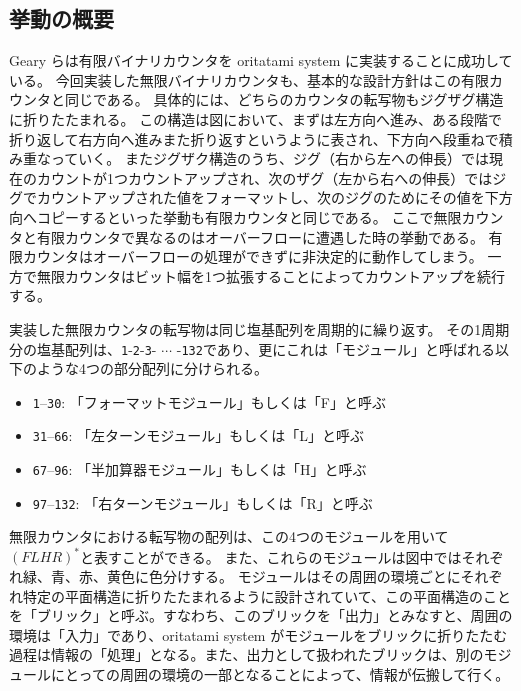 \documentclass[a4,11pt]{article}
\begin{document}

\subsection{挙動の概要}
Geary らは有限バイナリカウンタを oritatami system に実装することに成功している\cite{GeMeScSe2019}。
今回実装した無限バイナリカウンタも、基本的な設計方針はこの有限カウンタと同じである。
具体的には、どちらのカウンタの転写物もジグザグ構造に折りたたまれる。
この構造は図において、まずは左方向へ進み、ある段階で折り返して右方向へ進みまた折り返すというように表され、下方向へ段重ねで積み重なっていく。
またジグザク構造のうち、ジグ（右から左への伸長）では現在のカウントが1つカウントアップされ、次のザグ（左から右への伸長）ではジグでカウントアップされた値をフォーマットし、次のジグのためにその値を下方向へコピーするといった挙動も有限カウンタと同じである。
ここで無限カウンタと有限カウンタで異なるのはオーバーフローに遭遇した時の挙動である。
有限カウンタはオーバーフローの処理ができずに非決定的に動作してしまう。
一方で無限カウンタはビット幅を1つ拡張することによってカウントアップを続行する。
%
%


実装した無限カウンタの転写物は同じ塩基配列を周期的に繰り返す。
その1周期分の塩基配列は、\texttt{1}-\texttt{2}-\texttt{3}- $\cdots$ -\texttt{132}であり、更にこれは「モジュール」と呼ばれる以下のような4つの部分配列に分けられる。

\begin{itemize}
\item \texttt{1}--\texttt{30}: 「フォーマットモジュール」もしくは「F」と呼ぶ
\item \texttt{31}--\texttt{66}: 「左ターンモジュール」もしくは「L」と呼ぶ
\item \texttt{67}--\texttt{96}: 「半加算器モジュール」もしくは「H」と呼ぶ
\item \texttt{97}--\texttt{132}: 「右ターンモジュール」もしくは「R」と呼ぶ
\end{itemize}

無限カウンタにおける転写物の配列は、この4つのモジュールを用いて$(FLHR)^*$と表すことができる。
また、これらのモジュールは図中ではそれぞれ緑、青、赤、黄色に色分けする。
モジュールはその周囲の環境ごとにそれぞれ特定の平面構造に折りたたまれるように設計されていて、この平面構造のことを「ブリック」と呼ぶ。すなわち、このブリックを「出力」とみなすと、周囲の環境は「入力」であり、oritatami system がモジュールをブリックに折りたたむ過程は情報の「処理」となる。また、出力として扱われたブリックは、別のモジュールにとっての周囲の環境の一部となることによって、情報が伝搬して行く。
\end{document}
